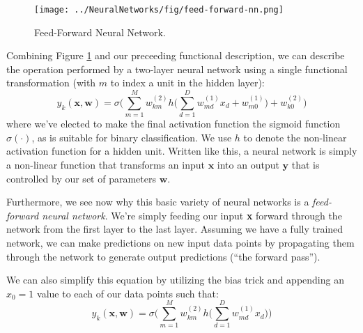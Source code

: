 \begin{figure}
    \centering
    \texttt{[image: ../NeuralNetworks/fig/feed-forward-nn.png]}
    \caption{Feed-Forward Neural Network.}
    \label{fig:feed-foward-nn}
\end{figure}


Combining Figure \ref{fig:feed-foward-nn} and our preceeding functional description, we can describe the operation performed by a two-layer neural network using a single functional transformation (with $m$ to index a unit in the hidden layer):
%
\begin{equation} \label{full-nn-equation}
	y_{k}(\textbf{x}, \textbf{w}) = \sigma\bigg(\sum_{m=1}^{M}w_{km}^{(2)} h\bigg(\sum_{d=1}^{D}w_{md}^{(1)}x_{d} + w_{m0}^{(1)}\bigg) + w_{k0}^{(2)}\bigg)
\end{equation}
where we've elected to make the final activation function the sigmoid function $\sigma(\cdot)$, as is suitable for binary classification.  We use $h$ to denote the non-linear activation function for a hidden unit.
%
Written like this, a neural network is simply a non-linear function that transforms an input $\textbf{x}$ into an output $\textbf{y}$ that is controlled by our set of parameters $\textbf{w}$.

Furthermore, we see now why this  basic variety of neural networks is a \textit{feed-forward neural network}. We're  simply feeding our input \textbf{x} forward through the network from the first layer to the last layer. Assuming we have a fully trained network, we can make predictions on new input data points by propagating them through the network to generate output predictions (``the forward pass'').

We can also simplify this equation by utilizing the bias trick and appending an $x_{0}=1$ value to each of our data points such that:
\begin{equation*}
	y_{k}(\textbf{x}, \textbf{w}) = \sigma\bigg(\sum_{m=1}^{M}w_{km}^{(2)} h\bigg(\sum_{d=1}^{D}w_{md}^{(1)}x_{d}\bigg)\bigg)
\end{equation*}


